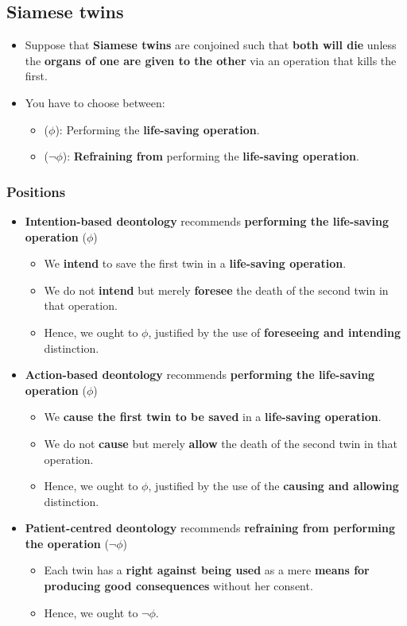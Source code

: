 \documentclass[11pt]{article}
\begin{document}
\subsection{Siamese twins}
\label{sec:orge68df04}
\begin{itemize}
\item Suppose that \textbf{Siamese twins} are conjoined such that \textbf{both will die} unless the \textbf{organs of one are given to the other} via an operation that kills the first.
\item You have to choose between:
\begin{itemize}
\item (\(\phi\)): Performing the \textbf{life-saving operation}.
\item (\(\neg \phi\)): \textbf{Refraining from} performing the \textbf{life-saving operation}.
\end{itemize}
\end{itemize}
\subsubsection{Positions}
\label{sec:org1d6e266}
\begin{itemize}
\item \textbf{Intention-based deontology} recommends \textbf{performing the life-saving operation} (\(\phi\))
\begin{itemize}
\item We \textbf{intend} to save the first twin in a \textbf{life-saving operation}.
\item We do not \textbf{intend} but merely \textbf{foresee} the death of the second twin in that operation.
\item Hence, we ought to \(\phi\), justified by the use of \textbf{foreseeing and intending} distinction.
\end{itemize}
\item \textbf{Action-based deontology} recommends \textbf{performing the life-saving operation} (\(\phi\))
\begin{itemize}
\item We \textbf{cause the first twin to be saved} in a \textbf{life-saving operation}.
\item We do not \textbf{cause} but merely \textbf{allow} the death of the second twin in that operation.
\item Hence, we ought to \(\phi\), justified by the use of the \textbf{causing and allowing} distinction.
\end{itemize}
\item \textbf{Patient-centred deontology} recommends \textbf{refraining from performing the operation} (\(\neg \phi\))
\begin{itemize}
\item Each twin has a \textbf{right against being used} as a mere \textbf{means for producing good consequences} without her consent.
\item Hence, we ought to \(\neg \phi\).
\end{itemize}
\end{itemize}
\end{document}
